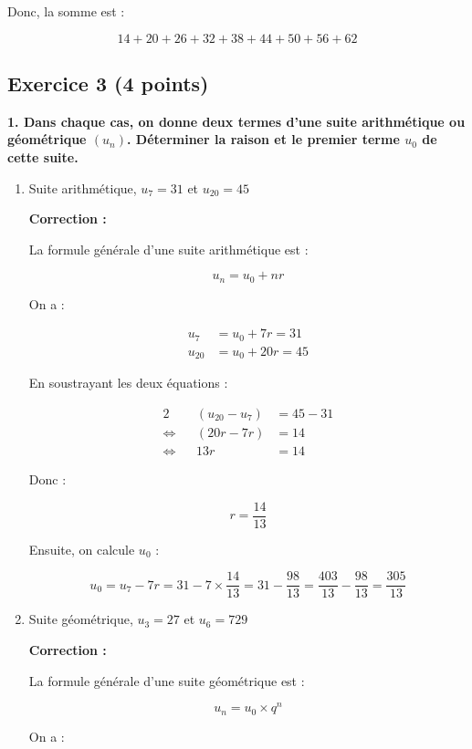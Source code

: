 \documentclass{article}
\begin{document}
Donc, la somme est :

\[ 14 + 20 + 26 + 32 + 38 + 44 + 50 + 56 + 62 \]

\bigskip

\subsection*{Exercice 3 (4 points)}

\textbf{1. Dans chaque cas, on donne deux termes d'une suite arithmétique ou géométrique \( (u_n) \). Déterminer la raison et le premier terme \( u_0 \) de cette suite.}

\begin{enumerate}[label=\alph*)]

\item Suite arithmétique, \( u_7 = 31 \) et \( u_{20} = 45 \)

\textbf{Correction :}

La formule générale d'une suite arithmétique est :

\[ u_n = u_0 + n r \]

On a :

\begin{align*}
u_7 &= u_0 + 7 r = 31 \\
u_{20} &= u_0 + 20 r = 45
\end{align*}

En soustrayant les deux équations :

\begin{alignat}{2}
    && (u_{20} - u_7) &= 45 - 31\\
    \iff && (20 r - 7 r) &= 14\\
    \iff && 13r &= 14
\end{alignat}

Donc :

\[ r = \dfrac{14}{13} \]

Ensuite, on calcule \( u_0 \) :

\[ u_0 = u_7 - 7 r = 31 - 7 \times \dfrac{14}{13} = 31 - \dfrac{98}{13} = \dfrac{403}{13} - \dfrac{98}{13} = \dfrac{305}{13} \]

\bigskip

\item Suite géométrique, \( u_3 = 27 \) et \( u_{6} = 729 \)

\textbf{Correction :}

La formule générale d'une suite géométrique est :

\[ u_n = u_0 \times q^n \]

On a :


\end{enumerate}
\end{document}
